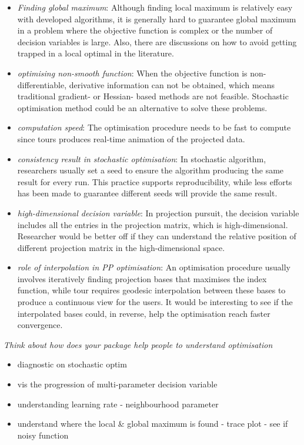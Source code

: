 \documentclass[12pt]{article}
\providecommand{\tightlist}{%
  \setlength{\itemsep}{0pt}\setlength{\parskip}{0pt}}
\begin{document}
\begin{itemize}
\item
  \emph{Finding global maximum}: Although finding local maximum is
  relatively easy with developed algorithms, it is generally hard to
  guarantee global maximum in a problem where the objective function is
  complex or the number of decision variables is large. Also, there are
  discussions on how to avoid getting trapped in a local optimal in the
  literature.
\item
  \emph{optimising non-smooth function}: When the objective function is
  non-differentiable, derivative information can not be obtained, which
  means traditional gradient- or Hessian- based methods are not
  feasible. Stochastic optimisation method could be an alternative to
  solve these problems.
\item
  \emph{computation speed}: The optimisation procedure needs to be fast
  to compute since tours produces real-time animation of the projected
  data.
\item
  \emph{consistency result in stochastic optimisation}: In stochastic
  algorithm, researchers usually set a seed to ensure the algorithm
  producing the same result for every run. This practice supports
  reproducibility, while less efforts has been made to guarantee
  different seeds will provide the same result.
\item
  \emph{high-dimensional decision variable}: In projection pursuit, the
  decision variable includes all the entries in the projection matrix,
  which is high-dimensional. Researcher would be better off if they can
  understand the relative position of different projection matrix in the
  high-dimensional space.
\item
  \emph{role of interpolation in PP optimisation}: An optimisation
  procedure usually involves iteratively finding projection bases that
  maximises the index function, while tour requires geodesic
  interpolation between these bases to produce a continuous view for the
  users. It would be interesting to see if the interpolated bases could,
  in reverse, help the optimisation reach faster convergence.
\end{itemize}

\emph{Think about how does your package help people to understand
optimisation}

\begin{itemize}
\tightlist
\item
  diagnostic on stochastic optim
\item
  vis the progression of multi-parameter decision variable
\item
  understanding learning rate - neighbourhood parameter
\item
  understand where the local \& global maximum is found - trace plot -
  see if noisy function
\end{itemize}
\end{document}
